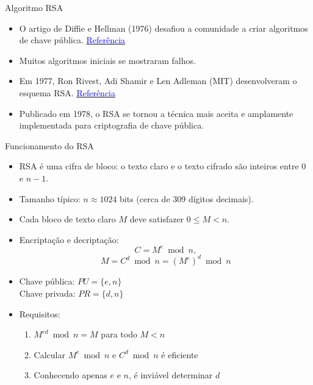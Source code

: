 \begin{frame}{Algoritmo RSA}
  \begin{itemize}
    \item O artigo de Diffie e Hellman (1976) desafiou a comunidade a criar algoritmos de chave pública. \href{https://dl.acm.org/doi/10.1145/1499799.1499815}{\textcolor{blue}{Referência}}
    \item Muitos algoritmos iniciais se mostraram falhos.
    \item Em 1977, Ron Rivest, Adi Shamir e Len Adleman (MIT) desenvolveram o esquema RSA. \href{https://dl.acm.org/doi/10.1145/359340.359342}{\textcolor{blue}{Referência}}
    \item Publicado em 1978, o RSA se tornou a técnica mais aceita e amplamente implementada para criptografia de chave pública.
  \end{itemize}
\end{frame}
\begin{frame}{Funcionamento do RSA}
  \begin{itemize}
    \item RSA é uma cifra de bloco: o texto claro e o texto cifrado são inteiros entre $0$ e $n-1$.
    \item Tamanho típico: $n \approx 1024$ bits (cerca de 309 dígitos decimais).
    \item Cada bloco de texto claro $M$ deve satisfazer $0 \le M < n$.
    \item Encriptação e decriptação:
          \[
            C = M^e \bmod n,
          \]
          \[
            M = C^d \bmod n = (M^e)^d \bmod n
          \]
    \item Chave pública: $PU = \{e, n\}$ \\
          Chave privada: $PR = \{d, n\}$
    \item Requisitos:
          \begin{enumerate}
            \item $M^{ed} \bmod n = M$ para todo $M < n$
            \item Calcular $M^e \bmod n$ e $C^d \bmod n$ é eficiente
            \item Conhecendo apenas $e$ e $n$, é inviável determinar $d$
          \end{enumerate}
  \end{itemize}
\end{frame}

